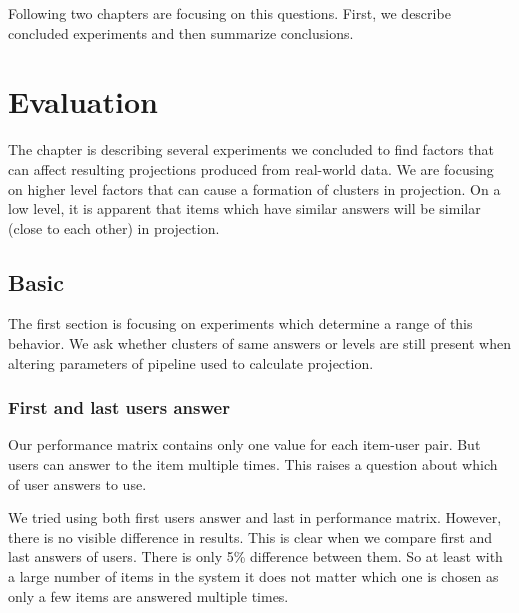 \documentclass[
  printed, %
  table,   %
  nolof,     %
  nolot,     %
  color,
  final,
  nocover
]{fithesis3}
\begin{document}

Following two chapters are focusing on this questions. First, we describe concluded experiments and then summarize conclusions.


\chapter{Evaluation}\label{evaluation}

The chapter is describing several experiments we concluded to find factors that can affect resulting projections produced from real-world data. We are focusing on higher level factors that can cause a formation of clusters in projection. On a low level, it is apparent that items which have similar answers will be similar (close to each other) in projection.


\section{Basic}\label{evaluation-basic}

The first section is focusing on experiments which determine a range of this behavior. We ask whether clusters of same answers or levels are still present when altering parameters of pipeline used to calculate projection.


\subsection{First and last users answer}\label{first-and-last-users-answer}


Our performance matrix contains only one value for each item-user pair. But users can answer to the item multiple times. This raises a question about which of user answers to use.


We tried using both first users answer and last in performance matrix. However, there is no visible difference in results. This is clear when we compare first and last answers of users. There is only 5\% difference between them. So at least with a large number of items in the system it does not matter which one is chosen as only a few items are answered multiple times.
\end{document}
